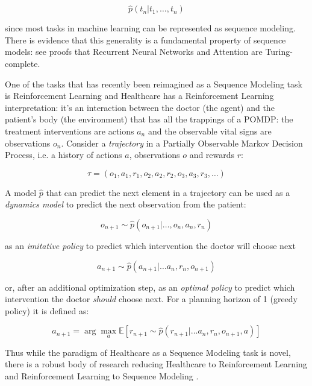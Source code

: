 \begin{equation}
    \hat{p}(t_n | t_1, \dots, t_n)
\end{equation}

since most tasks in machine learning can be represented as sequence modeling. 
There is evidence that this generality is a fundamental property of sequence models: see proofs that Recurrent Neural Networks \cite{siegelmannComputationTuringLimit1995} and Attention \cite{perezAttentionTuringComplete} are Turing-complete.

One of the tasks that has recently been reimagined as a Sequence Modeling task is Reinforcement Learning and Healthcare has a Reinforcement Learning interpretation: it's an interaction between the doctor (the agent) and the patient's body (the environment) that has all the trappings of a POMDP: the treatment interventions are actions $a_n$ and the observable vital signs are observations $o_n$.
Consider a \emph{trajectory} in a Partially Observable Markov Decision Process, i.e. a history of actions $a$, observations $o$ and rewards $r$:

\begin{equation}
    \tau = (o_1, a_1, r_1, o_2, a_2, r_2, o_3, a_3, r_3, \dots)
\end{equation}

A model $\hat{p}$ that can predict the next element in a trajectory can be used as a \emph{dynamics model} to predict the next observation from the patient:

\begin{equation}
    o_{n+1} \sim \hat{p}(o_{n+1} | \dots, o_n, a_n, r_n)
\end{equation}

as an \emph{imitative policy} to predict which intervention the doctor will choose next

\begin{equation}
    a_{n+1} \sim \hat{p}(a_{n+1} | \dots a_n, r_n, o_{n+1})
\end{equation}

or, after an additional optimization step, as an \emph{optimal policy} to predict which intervention the doctor \emph{should} choose next.
For a planning horizon of 1 (greedy policy) it is defined as:

\begin{equation}
    a_{n+1} = \arg \max_a \mathbb{E} [r_{n+1} \sim \hat{p}(r_{n+1} | \dots a_n, r_n, o_{n+1}, a)]
\end{equation}

Thus while the paradigm of Healthcare as a Sequence Modeling task is novel, there is a robust body of research reducing Healthcare to Reinforcement Learning \cite{yuReinforcementLearningHealthcare2021} and Reinforcement Learning to Sequence Modeling \cite{chenDecisionTransformerReinforcement2021, jannerOfflineReinforcementLearning2021, schmidhuberReinforcementLearningUpside2020}. 

